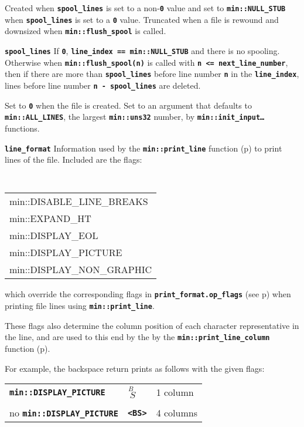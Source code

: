 \documentclass[12pt]{article}
\makeatletter
\newcommand{\TT}[1]{{\tt \bfseries #1}}
\newcommand{\ttmkey}[2]{\TT{#1}\index{#1@{\tt #1}!#2}}
\newcommand{\pagref}[1]{p\pageref{#1}}
\newcommand{\EOL}{\penalty \exhyphenpenalty}
\newenvironment{indpar}[1][0.3in]%
	{\begin{list}{}%
		     {\setlength{\itemsep}{0in}%
		      \setlength{\topsep}{0in}%
		      \setlength{\parsep}{1ex}%
		      \setlength{\labelwidth}{#1}%
		      \setlength{\leftmargin}{#1}%
		      \addtolength{\leftmargin}{\labelsep}}%
	 \item}%
	{\end{list}}
\newenvironment{itemlist}[1][1.2in]%
	{\begin{list}{}{\setlength{\labelwidth}{#1}%
		        \setlength{\leftmargin}{\labelwidth}%
		        \addtolength{\leftmargin}{+0.2in}%
		        \renewcommand{\makelabel}[1]{##1\hfill}}}%
	{\end{list}}
\makeatother
\begin{document}
\begin{itemlist}[1.4in]
Created when \TT{spool\_\EOL lines} is set to a non-\TT{0} value
and set to \TT{min::\EOL NULL\_\EOL STUB}
when \TT{spool\_\EOL lines} is set to a \TT{0} value.
Truncated when a file is rewound and downsized when
\TT{min::\EOL flush\_\EOL spool} is called.

\item[\ttmkey{spool\_\EOL lines}{in {\tt min::file}}]
If \TT{0}, \TT{line\_index~==~min::NULL\_STUB} and there is
no spooling.  Otherwise when \TT{min::flush\_spool(n)} is called
with \TT{n <= next\_\EOL line\_\EOL number}, then
if there are more than \TT{spool\_\EOL lines} before line number
\TT{n} in the \TT{line\_\EOL index}, lines before
line number \TT{n - spool\_lines} are deleted.

Set to \TT{0} when the file is created.  Set to an argument
that defaults to \TT{min::\EOL ALL\_\EOL LINES}, the largest
\TT{min::uns32} number,
by \TT{min::\EOL init\_\EOL input\ldots} functions.

\item[\ttmkey{line\_\EOL format}{in {\tt min::file}}]\label{FILE_LINE_FORMAT}
Information used by the \TT{min::\EOL print\_\EOL line} function
(\pagref{MIN::PRINT_LINE}) to print lines of the file.
Included are the flags:
\begin{indpar}
\tt
\begin{tabular}{l}
min::DISABLE\_LINE\_BREAKS \\
min::EXPAND\_HT \\
min::DISPLAY\_EOL \\
min::DISPLAY\_PICTURE \\
min::DISPLAY\_NON\_GRAPHIC \\
\end{tabular}
\end{indpar}

which override the corresponding flags in
\TT{print\_\EOL format.op\_flags}
(see \pagref{PRINT_FORMAT_OP_FLAGS}) when printing file lines using
\TT{min::\EOL print\_\EOL line}.

These flags also determine the column position of each character representative
in the line, and are used to this end by the
by the \TT{min::\EOL print\_\EOL line\_\EOL column}
function (\pagref{MIN::PRINT_LINE_COLUMN}).

For example, the backspace
return prints as follows with the given flags:
\begin{center}
\begin{tabular}{l@{~~~~}ll}
\TT{min::DISPLAY\_PICTURE}
	& {\tiny $\stackrel{\textstyle B~}{~S}$} & 1 column \\
\\[1ex]
no \TT{min::DISPLAY\_PICTURE} & \TT{<BS>} & 4 columns \\
\end{tabular}
\end{center}


\end{itemlist}
\end{document}
